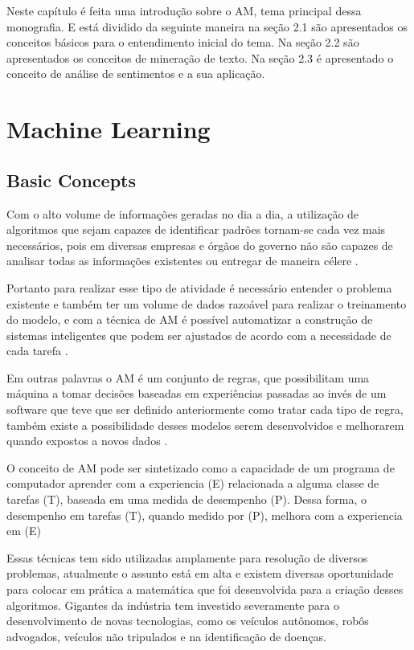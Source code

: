Neste capítulo é feita uma introdução sobre o \acrshort{AM}, tema principal dessa monografia. E está dividido da seguinte
maneira na seção 2.1 são apresentados os conceitos básicos para o entendimento inicial do tema. Na seção 2.2 são apresentados
os conceitos de mineração de texto. Na seção 2.3 é apresentado o conceito de análise de sentimentos e a sua aplicação.


\section{Machine Learning}
  \subsection{Basic Concepts}

    Com o alto volume de informações geradas no dia a dia, a utilização de algoritmos que sejam capazes de identificar padrões tornam-se cada
    vez mais necessários, pois em diversas empresas e órgãos do governo não são capazes de analisar todas as informações existentes ou entregar
    de maneira célere \cite{nasrabadi2007pattern}. 
    
    Portanto para realizar esse tipo de atividade é necessário entender o problema existente e também ter um volume de dados razoável para realizar o treinamento do modelo, e com a técnica de \acrshort{AM} é possível automatizar a construção
    de sistemas inteligentes que podem ser ajustados de acordo com a necessidade de cada tarefa \cite{bonaccorso2017machine}.

    Em outras palavras o \acrshort{AM} é um conjunto de regras, que possibilitam uma máquina a tomar decisões baseadas em experiências passadas ao invés
    de um software que teve que ser definido anteriormente como tratar cada tipo de regra, também existe a possibilidade desses modelos serem desenvolvidos
    e melhorarem quando expostos a novos dados \cite{zurada1995review}.


    O conceito de \acrshort{AM} pode ser sintetizado como a capacidade de um programa de computador aprender com a experiencia (E) relacionada a alguma 
    classe de tarefas (T), baseada em uma medida de desempenho (P). Dessa forma, o desempenho em tarefas (T), quando medido por (P), melhora com a 
    experiencia em (E) \cite{mitchell}

    Essas técnicas tem sido utilizadas amplamente para resolução de diversos problemas, atualmente o assunto está em alta e existem diversas oportunidade
    para colocar em prática a matemática que foi desenvolvida para a criação desses algoritmos. Gigantes da indústria tem investido severamente para
    o desenvolvimento de novas tecnologias, como os veículos autônomos, robôs advogados, veículos não tripulados e na identificação de doenças.

